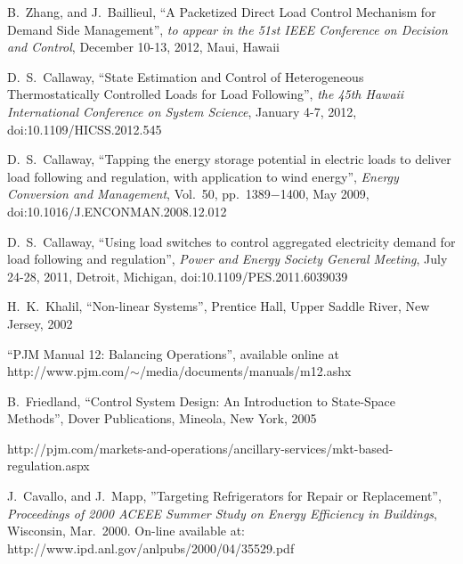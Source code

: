 \documentclass[journal]{IEEEtran}
\begin{document}
\begin{thebibliography}{20}
 B.~Zhang, and J.~Baillieul, ``A Packetized Direct Load Control Mechanism for Demand Side Management'', \textit{to appear in the 51st IEEE Conference on Decision and Control}, December 10-13, 2012, Maui, Hawaii

 D.~S.~Callaway, ``State Estimation and Control of Heterogeneous Thermostatically Controlled Loads for Load Following'', \textit{the 45th Hawaii International Conference on System Science}, January 4-7, 2012, doi:10.1109/HICSS.2012.545 

 D.~S.~Callaway, ``Tapping the energy storage potential in electric loads to deliver load following and regulation, with application to wind energy'', \textit{Energy Conversion and Management}, Vol.~50, pp.~1389$-$1400, May 2009, doi:10.1016/J.ENCONMAN.2008.12.012

 D.~S.~Callaway, ``Using load switches to control aggregated electricity demand for load following and regulation'', \textit{Power and Energy Society General Meeting}, July 24-28, 2011, Detroit, Michigan, doi:10.1109/PES.2011.6039039 

 H.~K.~Khalil, ``Non-linear Systems'', Prentice Hall, Upper Saddle River, New Jersey, 2002

 ``PJM Manual 12: Balancing Operations'', available online at http://www.pjm.com/$\sim$/media/documents/manuals/m12.ashx

 B.~Friedland, ``Control System Design: An Introduction to State-Space Methods'', Dover Publications, Mineola, New York, 2005

 http://pjm.com/markets-and-operations/ancillary-services/mkt-based-regulation.aspx

 J.~Cavallo, and J.~Mapp, ''Targeting Refrigerators for Repair or Replacement'', \textit{Proceedings of 2000 ACEEE Summer Study on Energy Efficiency in Buildings}, Wisconsin, Mar.~2000. On-line available at: http://www.ipd.anl.gov/anlpubs/2000/04/35529.pdf
\end{thebibliography}
\end{document}
